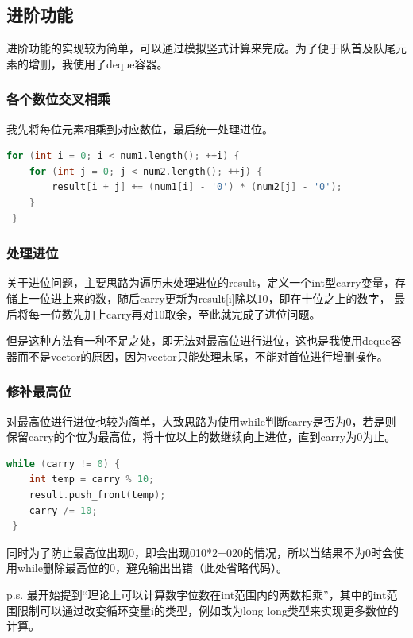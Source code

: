 \documentclass[a4paper, 11pt, UTF8]{ctexart}
\begin{document}
\subsection{进阶功能}

进阶功能的实现较为简单，可以通过模拟竖式计算来完成。为了便于队首及队尾元素的增删，我使用了deque容器。

\subsubsection{各个数位交叉相乘}

我先将每位元素相乘到对应数位，最后统一处理进位。

\begin{lstlisting}[language=C++, basicstyle=\ttfamily]
 for (int i = 0; i < num1.length(); ++i) {
    for (int j = 0; j < num2.length(); ++j) {
        result[i + j] += (num1[i] - '0') * (num2[j] - '0');
    }
 }
\end{lstlisting}

\subsubsection{处理进位}

关于进位问题，主要思路为遍历未处理进位的result，定义一个int型carry变量，存储上一位进上来的数，随后carry更新为result[i]除以10，即在十位之上的数字，
最后将每一位数先加上carry再对10取余，至此就完成了进位问题。

但是这种方法有一种不足之处，即无法对最高位进行进位，这也是我使用deque容器而不是vector的原因，因为vector只能处理末尾，不能对首位进行增删操作。

\subsubsection{修补最高位}

对最高位进行进位也较为简单，大致思路为使用while判断carry是否为0，若是则保留carry的个位为最高位，将十位以上的数继续向上进位，直到carry为0为止。

\begin{lstlisting}[language=C++, basicstyle=\ttfamily]
while (carry != 0) {
	int temp = carry % 10;
	result.push_front(temp);
	carry /= 10;
 }
\end{lstlisting}

同时为了防止最高位出现0，即会出现010*2=020的情况，所以当结果不为0时会使用while删除最高位的0，避免输出出错（此处省略代码）。

p.s. 最开始提到“理论上可以计算数字位数在int范围内的两数相乘”，其中的int范围限制可以通过改变循环变量i的类型，例如改为long long类型来实现更多数位的计算。
\end{document}
